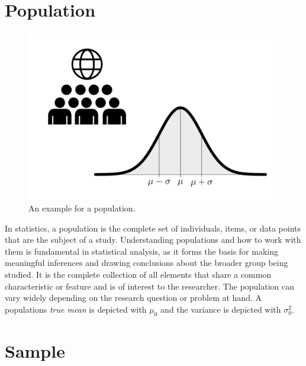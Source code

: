 \documentclass[
  a4paper,
]{scrbook}
\begin{document}
\section{Population}\label{population}

\begin{figure}[ht]

{\centering \includegraphics[width=0.75\linewidth,height=\textheight,keepaspectratio]{chapter000/002_Population.png}

}

\caption{An example for a population.}

\end{figure}%

In statistics, a population is the complete set of individuals, items,
or data points that are the subject of a study. Understanding
populations and how to work with them is fundamental in statistical
analysis, as it forms the basis for making meaningful inferences and
drawing conclusions about the broader group being studied. It is the
complete collection of all elements that share a common characteristic
or feature and is of interest to the researcher. The population can vary
widely depending on the research question or problem at hand. A
populations \emph{true mean} is depicted with
\hyperref[truemean-gloss]{\(\mu_0\)} and the variance is depicted with
\hyperref[truevariance-gloss]{\(\sigma_0^2\)}.

\section{Sample}\label{sample}
\end{document}
